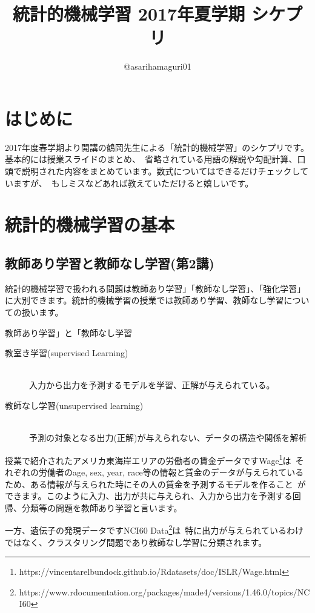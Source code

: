 \documentclass[uplatex]{jsarticle}
\title{統計的機械学習 2017年夏学期 シケプリ}
\author{@asarihamaguri01}
\begin{document}
\maketitle

\section{はじめに}
2017年度春学期より開講の鶴岡先生による「統計的機械学習」のシケプリです。基本的には授業スライドのまとめ、\
省略されている用語の解説や勾配計算、口頭で説明された内容をまとめています。数式についてはできるだけチェックしていますが、\
もしミスなどあれば教えていただけると嬉しいです。


\section{統計的機械学習の基本}
\subsection{教師あり学習と教師なし学習(第2講)}
統計的機械学習で扱われる問題は教師あり学習」「教師なし学習」、「強化学習」に大別できます。統計的機械学習の授業では教師あり学習、教師なし学習についての扱います。

\begin{itembox}[l]{教師あり学習」と「教師なし学習}
  \begin{description}
    \item [教室き学習(supervised Learning)]\mbox{}\\
    入力から出力を予測するモデルを学習、正解が与えられている。
    \item [教師なし学習(unsupervised learning)]\mbox{}\\
    予測の対象となる出力(正解)が与えられない、データの構造や関係を解析
  \end{description}
\end{itembox}

授業で紹介されたアメリカ東海岸エリアの労働者の賃金データですWage\footnote{https://vincentarelbundock.github.io/Rdatasets/doc/ISLR/Wage.html}は\
それぞれの労働者のage, sex, year, race等の情報と賃金のデータが与えられているため、ある情報が与えられた時にその人の賃金を予測するモデルを作ること\
ができます。このように入力、出力が共に与えられ、入力から出力を予測する回帰、分類等の問題を教師あり学習と言います。

一方、遺伝子の発現データですNCI60 Data\footnote{https://www.rdocumentation.org/packages/made4/versions/1.46.0/topics/NCI60}は\
特に出力が与えられているわけではなく、クラスタリング問題であり教師なし学習に分類されます。
\end{document}
